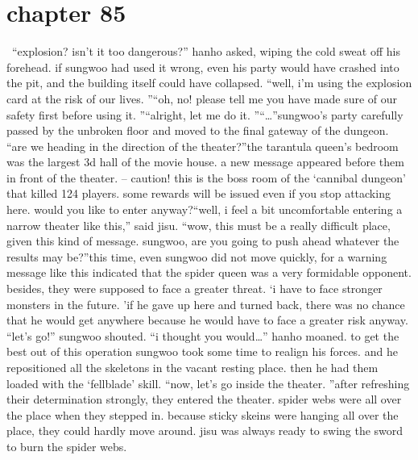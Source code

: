 \section{chapter 85}






 “explosion? isn’t it too dangerous?” hanho asked, wiping the cold sweat off his forehead.
if sungwoo had used it wrong, even his party would have crashed into the pit, and the building itself could have collapsed.
“well, i’m using the explosion card at the risk of our lives.
”“oh, no! please tell me you have made sure of our safety first before using it.
”“alright, let me do it.
”“…”sungwoo’s party carefully passed by the unbroken floor and moved to the final gateway of the dungeon.
“are we heading in the direction of the theater?”the tarantula queen’s bedroom was the largest 3d hall of the movie house.
 a new message appeared before them in front of the theater.
– caution! this is the boss room of the ‘cannibal dungeon’ that killed 124 players.
 some rewards will be issued even if you stop attacking here.
 would you like to enter anyway?“well, i feel a bit uncomfortable entering a narrow theater like this,” said jisu.
“wow, this must be a really difficult place, given this kind of message.
 sungwoo, are you going to push ahead whatever the results may be?”this time, even sungwoo did not move quickly, for a warning message like this indicated that the spider queen was a very formidable opponent.
 besides, they were supposed to face a greater threat.
‘i have to face stronger monsters in the future.
’if he gave up here and turned back, there was no chance that he would get anywhere because he would have to face a greater risk anyway.
“let’s go!” sungwoo shouted.
“i thought you would…” hanho moaned.
to get the best out of this operation sungwoo took some time to realign his forces.
 and he repositioned all the skeletons in the vacant resting place.
 then he had them loaded with the ‘fellblade’ skill.
“now, let’s go inside the theater.
”after refreshing their determination strongly, they entered the theater.
spider webs were all over the place when they stepped in.
 because sticky skeins were hanging all over the place, they could hardly move around.
 jisu was always ready to swing the sword to burn the spider webs.

